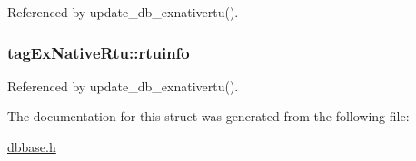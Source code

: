 Referenced by update\-\_\-db\-\_\-exnativertu().

\hypertarget{structtagExNativeRtu_a1bf748b58223237175f02b7451675f81}{
\subsubsection[{rtuinfo}]{ tag\-Ex\-Native\-Rtu\-::rtuinfo}}\label{structtagExNativeRtu_a1bf748b58223237175f02b7451675f81}


Referenced by update\-\_\-db\-\_\-exnativertu().



The documentation for this struct was generated from the following file\-:\begin{DoxyCompactItemize}
\item 
\hyperlink{dbbase_8h}{dbbase.\-h}\end{DoxyCompactItemize}
